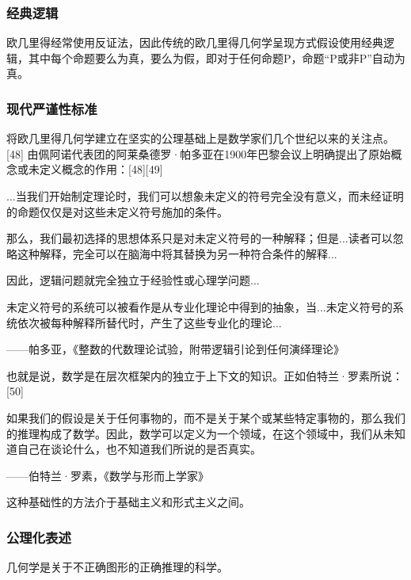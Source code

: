 \subsubsection{经典逻辑}
欧几里得经常使用反证法，因此传统的欧几里得几何学呈现方式假设使用经典逻辑，其中每个命题要么为真，要么为假，即对于任何命题P，命题“P或非P”自动为真。
\subsubsection{现代严谨性标准}
将欧几里得几何学建立在坚实的公理基础上是数学家们几个世纪以来的关注点。[48] 由佩阿诺代表团的阿莱桑德罗·帕多亚在1900年巴黎会议上明确提出了原始概念或未定义概念的作用：[48][49]

...当我们开始制定理论时，我们可以想象未定义的符号完全没有意义，而未经证明的命题仅仅是对这些未定义符号施加的条件。

那么，我们最初选择的思想体系只是对未定义符号的一种解释；但是...读者可以忽略这种解释，完全可以在脑海中将其替换为另一种符合条件的解释...

因此，逻辑问题就完全独立于经验性或心理学问题...

未定义符号的系统可以被看作是从专业化理论中得到的抽象，当...未定义符号的系统依次被每种解释所替代时，产生了这些专业化的理论...

——帕多亚，《整数的代数理论试验，附带逻辑引论到任何演绎理论》

也就是说，数学是在层次框架内的独立于上下文的知识。正如伯特兰·罗素所说：[50]

如果我们的假设是关于任何事物的，而不是关于某个或某些特定事物的，那么我们的推理构成了数学。因此，数学可以定义为一个领域，在这个领域中，我们从未知道自己在谈论什么，也不知道我们所说的是否真实。

——伯特兰·罗素，《数学与形而上学家》

这种基础性的方法介于基础主义和形式主义之间。
\subsubsection{公理化表述}  
几何学是关于不正确图形的正确推理的科学。  

